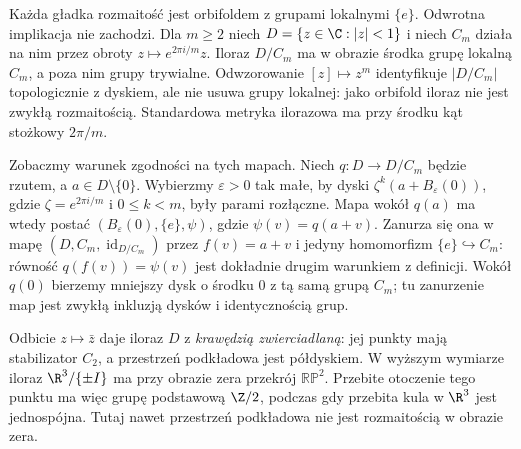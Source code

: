 \begin{przyklad}
\label{prz:klein-orbifoldy}
Każda gładka rozmaitość jest orbifoldem z grupami lokalnymi
$\{e\}$. Odwrotna implikacja nie zachodzi. Dla $m\geq2$ niech
$D=\{z\in\C:|z|<1\}$ i niech $C_m$ działa na nim przez obroty
$z\mapsto e^{2\pi i/m}z$. Iloraz $D/C_m$ ma w obrazie środka
grupę lokalną $C_m$, a poza nim grupy trywialne. Odwzorowanie
$[z]\mapsto z^m$ identyfikuje $|D/C_m|$ topologicznie z dyskiem,
ale nie usuwa grupy lokalnej: jako orbifold iloraz nie jest zwykłą
rozmaitością. Standardowa metryka ilorazowa ma przy środku kąt
stożkowy $2\pi/m$.

Zobaczmy warunek zgodności na tych mapach. Niech
$q:D\to D/C_m$ będzie rzutem, a $a\in D\setminus\{0\}$.
Wybierzmy $\varepsilon>0$ tak małe, by dyski
$\zeta^k(a+B_\varepsilon(0))$, gdzie
$\zeta=e^{2\pi i/m}$ i $0\leq k<m$, były parami rozłączne.
Mapa wokół $q(a)$ ma wtedy postać
$(B_\varepsilon(0),\{e\},\psi)$, gdzie
$\psi(v)=q(a+v)$. Zanurza się ona w mapę
$(D,C_m,\operatorname{id}_{D/C_m})$ przez $f(v)=a+v$
i jedyny homomorfizm $\{e\}\hookrightarrow C_m$:
równość $q(f(v))=\psi(v)$ jest dokładnie drugim
warunkiem z definicji.
Wokół $q(0)$ bierzemy mniejszy dysk o środku $0$ z tą
samą grupą $C_m$; tu zanurzenie map jest zwykłą
inkluzją dysków i identycznością grup.

Odbicie $z\mapsto\bar z$ daje iloraz $D$ z \emph{krawędzią
zwierciadlaną}: jej punkty mają stabilizator $C_2$, a przestrzeń
podkładowa jest półdyskiem. W wyższym wymiarze iloraz
$\R^3/\{\pm I\}$ ma przy obrazie zera przekrój $\mathbb{RP}^2$.
Przebite otoczenie tego punktu ma więc grupę podstawową $\Z/2$,
podczas gdy przebita kula w $\R^3$ jest jednospójna. Tutaj nawet
przestrzeń podkładowa nie jest rozmaitością w obrazie zera.
\end{przyklad}

